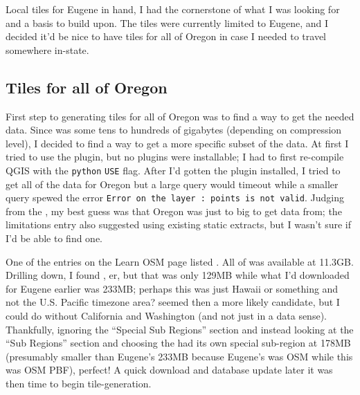 \documentclass{article}
\begin{document}
Local tiles for Eugene in hand, I had the cornerstone of what I was looking for and a basis to build upon.  The tiles were currently limited to Eugene, and I decided it'd be nice to have tiles for all of Oregon in case I needed to travel somewhere in-state.

\subsection{Tiles for all of Oregon}
First step to generating tiles for all of Oregon was to find a way to get the needed data.  Since  was some tens to hundreds of gigabytes (depending on compression level), I decided to find a way to get a more specific subset of the data.  At first I tried to use the  plugin, but no plugins were installable; I had to first re-compile QGIS with the \texttt{python} \texttt{USE} flag.  After I'd gotten the plugin installed, I tried to get all of the data for Oregon but a large query would timeout while a smaller query spewed the error \texttt{Error on the layer : points is not valid}.  Judging from the , my best guess was that Oregon was just to big to get data from; the limitations entry also suggested using existing static extracts, but I wasn't sure if I'd be able to find one.

One of the entries on the Learn OSM  page listed .  All of  was available at 11.3GB.  Drilling down, I found , er, but that was only 129MB while what I'd downloaded for Eugene earlier was 233MB; perhaps this was just Hawaii or something and not the U.S. Pacific timezone area?   seemed then a more likely candidate, but I could do without California and Washington (and not just in a data sense).  Thankfully, ignoring the ``Special Sub Regions'' section and instead looking at the ``Sub Regions'' section and choosing the  had its own special  sub-region at 178MB (presumably smaller than Eugene's 233MB because Eugene's  was OSM while this was OSM PBF), perfect!  A quick download and database update later it was then time to begin tile-generation.
\end{document}
